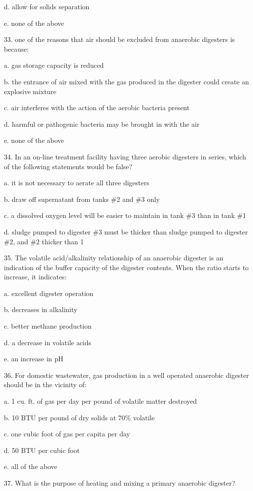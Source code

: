 \documentclass{article}
\begin{document}
d. allow for solids separation 

e. none of the above 


33. one of the reasons that air should be excluded from anaerobic digesters is because: 

a. gas storage capacity is reduced 

b. the entrance of air mixed with the gas produced in the digester could create an explosive mixture 

c. air interferes with the action of the aerobic bacteria present 

d. harmful or pathogenic bacteria may be brought in with the air 

e. none of the above 


34. In an on-line treatment facility having three aerobic digesters in series, which of the following statements would be false? 

a. it is not necessary to aerate all three digesters 

b. draw off supernatant from tanks \#2 and \#3 only 

c. a dissolved oxygen level will be easier to maintain in tank \#3 than in tank \#1 

d. sludge pumped to digester \#3 must be thicker than sludge pumped to digester \#2, and \#2 thicker than 1 


35. The volatile acid/alkalinity relationship of an anaerobic digester is an indication of the buffer capacity of the digester contents. When the ratio starts to increase, it indicates: 

a. excellent digester operation 

b. decreases in alkalinity 

c. better methane production 

d. a decrease in volatile acids 

e. an increase in pH 


36. For domestic wastewater, gas production in a well operated anaerobic digester should be in the vicinity of: 

a. 1 cu. ft. of gas per day per pound of volatile matter destroyed 

b. 10 BTU per pound of dry solids at 70\% volatile 

c. one cubic foot of gas per capita per day 

d. 50 BTU per cubic foot 

e. all of the above 


37. What is the purpose of heating and mixing a primary anaerobic digester? 
\end{document}
